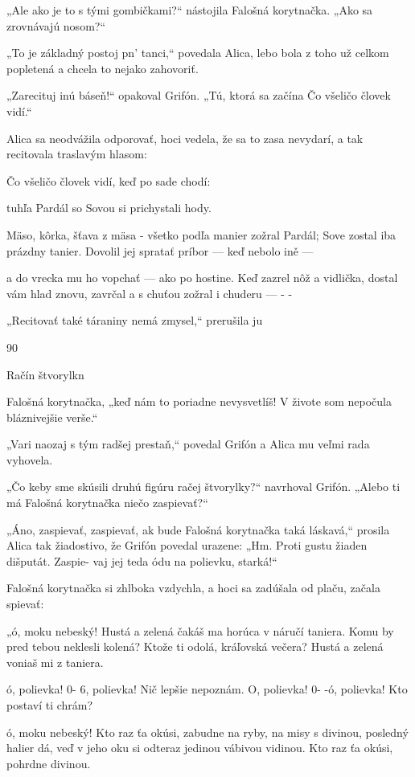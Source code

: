 \documentclass[12pt]{book}
\begin{document}
\begin{Parallel}[p]{}{}
{„Ale ako je to s tými gombičkami?“ nástojila Falošná
korytnačka. „Ako sa zrovnávajú nosom?“

„To je základný postoj pn' tanci,“ povedala Alica, lebo
bola z toho už celkom popletená a chcela to nejako
zahovoriť.

„Zarecituj inú báseň!“ opakoval Grifón. „Tú, ktorá sa
začína Čo všeličo človek vidí.“

Alica sa neodvážila odporovať, hoci vedela, že sa to zasa
nevydarí, a tak recitovala traslavým hlasom:

Čo všeličo človek vidí, keď po sade chodí:

tuhľa Pardál so Sovou si prichystali hody.

Mäso, kôrka, šťava z mäsa - všetko podľa manier
zožral Pardál; Sove zostal iba prázdny tanier.
Dovolil jej spratať príbor — keď nebolo ině —

a do vrecka mu ho vopchať — ako po hostine.
Keď zazrel nôž a vidlička, dostal vám hlad znovu,
zavrčal a s chuťou zožral i chuderu — - -

„Recitovať také táraniny nemá zmysel,“ prerušila ju

90

Račín štvorylkn

Falošná korytnačka, „keď nám to poriadne nevysvetlíš!
V živote som nepočula bláznivejšie verše.“

„Vari naozaj s tým radšej prestaň,“ povedal Grifón
a Alica mu veľmi rada vyhovela.

„Čo keby sme skúsili druhú figúru račej štvorylky?“
navrhoval Grifón. „Alebo ti má Falošná korytnačka niečo
zaspievať?“

„Áno, zaspievať, zaspievať, ak bude Falošná korytnačka
taká láskavá,“ prosila Alica tak žiadostivo, že Grifón
povedal urazene: „Hm. Proti gustu žiaden dišputát. Zaspie-
vaj jej teda ódu na polievku, starká!“

Falošná korytnačka si zhlboka vzdychla, a hoci sa
zadúšala od plaču, začala spievať:

„ó, moku nebeský! Hustá a zelená
čakáš ma horúca v náručí taniera.
Komu by pred tebou neklesli kolená?
Ktože ti odolá, kráľovská večera?
Hustá a zelená voniaš mi z taniera.

 

ó, polievka! 0- 6, polievka!
Nič lepšie nepoznám.
O, polievka! 0- -ó, polievka!
Kto postaví ti chrám?

ó, moku nebeský! Kto raz ťa okúsi,
zabudne na ryby, na misy s divinou,
posledný halier dá, veď v jeho oku si
odteraz jedinou vábivou vidinou.
Kto raz ťa okúsi, pohrdne divinou.

}
\end{Parallel}
\end{document}
